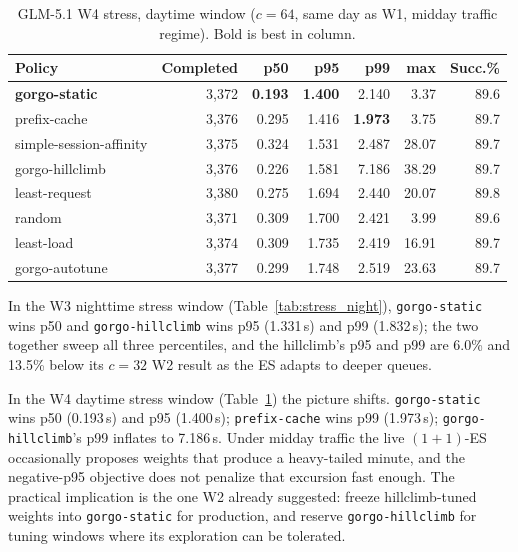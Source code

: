 \documentclass{article}
\begin{document}
\begin{table}[t]
\centering
\small
\caption{GLM-5.1 W4 stress, daytime window ($c{=}64$, same day as W1, midday
  traffic regime). Bold is best in column.}
\label{tab:stress_midday}
\begin{tabular}{lrrrrrr}
\toprule
Policy & Completed & p50 & p95 & p99 & max & Succ.\% \\
\midrule
\textbf{gorgo-static}    & 3{,}372 & \textbf{0.193} & \textbf{1.400} & 2.140          &  3.37 & 89.6 \\
prefix-cache             & 3{,}376 & 0.295          & 1.416          & \textbf{1.973} &  3.75 & 89.7 \\
simple-session-affinity  & 3{,}375 & 0.324          & 1.531          & 2.487          & 28.07 & 89.7 \\
gorgo-hillclimb          & 3{,}376 & 0.226          & 1.581          & 7.186          & 38.29 & 89.7 \\
least-request            & 3{,}380 & 0.275          & 1.694          & 2.440          & 20.07 & 89.8 \\
random                   & 3{,}371 & 0.309          & 1.700          & 2.421          &  3.99 & 89.6 \\
least-load               & 3{,}374 & 0.309          & 1.735          & 2.419          & 16.91 & 89.7 \\
gorgo-autotune           & 3{,}377 & 0.299          & 1.748          & 2.519          & 23.63 & 89.7 \\
\bottomrule
\end{tabular}
\end{table}

In the W3 nighttime stress window (Table~\ref{tab:stress_night}),
\texttt{gorgo-static} wins p50 and \texttt{gorgo-hillclimb} wins p95 (1.331\,s)
and p99 (1.832\,s); the two together sweep all three percentiles, and the
hillclimb's p95 and p99 are 6.0\% and 13.5\% below its $c{=}32$ W2 result as
the ES adapts to deeper queues.

In the W4 daytime stress window (Table~\ref{tab:stress_midday}) the picture
shifts. \texttt{gorgo-static} wins p50 (0.193\,s) and p95 (1.400\,s);
\texttt{prefix-cache} wins p99 (1.973\,s); \texttt{gorgo-hillclimb}'s p99
inflates to 7.186\,s. Under midday traffic the live $(1{+}1)$-ES occasionally
proposes weights that produce a heavy-tailed minute, and the negative-p95
objective does not penalize that excursion fast enough. The practical
implication is the one W2 already suggested: freeze hillclimb-tuned weights
into \texttt{gorgo-static} for production, and reserve \texttt{gorgo-hillclimb}
for tuning windows where its exploration can be tolerated.
\end{document}
